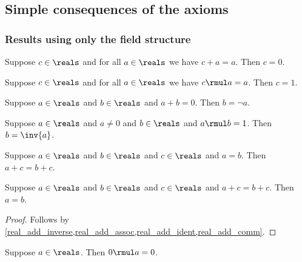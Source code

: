 \subsection{Simple consequences of the axioms}

\subsubsection{Results using only the field structure}

\begin{proposition}\label{real_add_ident_unique}
    Suppose $c\in\reals$ and for all $a\in\reals$ we have $c + a = a$.
    Then $c = 0$.
\end{proposition}

\begin{proposition}\label{real_mul_ident_unique}
    Suppose $c\in\reals$ and for all $a\in\reals$ we have $c \rmul a = a$.
    Then $c = 1$.
\end{proposition}

\begin{proposition}\label{real_add_inverse_unique}
    Suppose $a\in\reals$ and $b\in\reals$ and $a + b = 0$.
    Then $b = \neg{a}$.
\end{proposition}

\begin{proposition}\label{real_mul_inverse_unique}
    Suppose $a\in\reals$ and $a\neq 0$ and $b\in\reals$ and $a \rmul b = 1$.
    Then $b = \inv{a}$.
\end{proposition}

\begin{proposition}\label{real_add_eq_subst}
    Suppose $a\in\reals$ and $b\in\reals$ and $c\in\reals$ and $a = b$.
    Then $a + c = b + c$.
\end{proposition}

\begin{proposition}\label{real_add_cancel}
    Suppose $a\in\reals$ and $b\in\reals$ and $c\in\reals$ and $a + c = b + c$.
    Then $a = b$.
\end{proposition}
\begin{proof}
    Follows by \cref{real_add_inverse,real_add_assoc,real_add_ident,real_add_comm}.
\end{proof}

\begin{proposition}\label{real_mul_zero}
    Suppose $a\in\reals$.
    Then $0 \rmul a = 0$.
\end{proposition}

